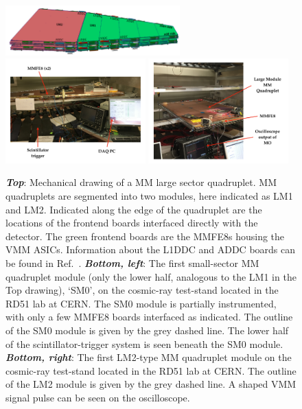 \begin{figure}[!htb]
    \begin{center}
        \includegraphics[width=0.6\textwidth]{figures/nsw/frontend/mm_quad_elx}
        \includegraphics[width=0.48\textwidth]{figures/nsw/frontend/mmfe8_sm0_labelledPDF}
        \includegraphics[width=0.48\textwidth]{figures/nsw/frontend/mmfe8_lm2_labelledPDF}
        \caption{
            \textbf{\textit{Top}}: Mechanical drawing of a MM large sector quadruplet.
                MM quadruplets are segmented into two modules, here indicated as LM1 and LM2.
                Indicated along the edge of the quadruplet are the locations of the frontend boards
                interfaced directly with the detector.
                The green frontend boards are the MMFE8s housing the VMM ASICs.
                Information about the L1DDC and ADDC boards can be found in Ref.~\cite{NSWFrontEndChristos}.
            \textbf{\textit{Bottom, left}}: The first small-sector MM quadruplet module (only the lower half, analogous to the LM1 in the Top drawing), `SM0', on the cosmic-ray
                test-stand located in the RD51 lab at CERN.
                The SM0 module is partially instrumented, with only a few MMFE8 boards interfaced
                as indicated.
                The outline of the SM0 module is given by the grey dashed line.
                The lower half of the scintillator-trigger system is seen beneath the SM0 module.
            \textbf{\textit{Bottom, right}}: The first LM2-type MM quadruplet module on the cosmic-ray
                test-stand located in the RD51 lab at CERN.
                The outline of the LM2 module is given by the grey dashed line.
                A shaped VMM signal pulse can be seen on the oscilloscope.
        }
        \label{fig:mm_quad_elx}
    \end{center}
\end{figure}
